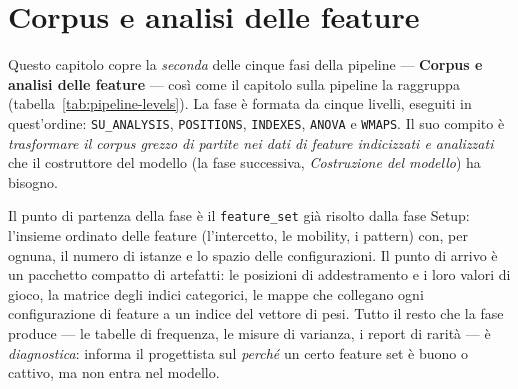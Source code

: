 %
%
%
%
%
%
%
%

%

\chapter{Corpus e analisi delle feature}
\label{ch:corpus-analisi}

Questo capitolo copre la \emph{seconda} delle cinque fasi della pipeline —
\textbf{Corpus e analisi delle feature} — così come il capitolo sulla pipeline
la raggruppa (tabella~\ref{tab:pipeline-levels}). La fase è formata da cinque
livelli, eseguiti in quest'ordine: \texttt{SU\_ANALYSIS}, \texttt{POSITIONS},
\texttt{INDEXES}, \texttt{ANOVA} e \texttt{WMAPS}. Il suo compito è
\emph{trasformare il corpus grezzo di partite nei dati di feature
indicizzati e analizzati} che il costruttore del modello (la fase successiva,
\emph{Costruzione del modello}) ha bisogno.

Il punto di partenza della fase è il \texttt{feature\_set} già risolto dalla
fase Setup: l'insieme ordinato delle feature (l'intercetto, le mobility, i
pattern) con, per ognuna, il numero di istanze e lo spazio delle
configurazioni. Il punto di arrivo è un pacchetto compatto di artefatti: le
posizioni di addestramento e i loro valori di gioco, la matrice degli indici
categorici, le mappe che collegano ogni configurazione di feature a un indice
del vettore di pesi. Tutto il resto che la fase produce — le tabelle di
frequenza, le misure di varianza, i report di rarità — è \emph{diagnostica}:
informa il progettista sul \emph{perché} un certo feature set è buono o
cattivo, ma non entra nel modello.

